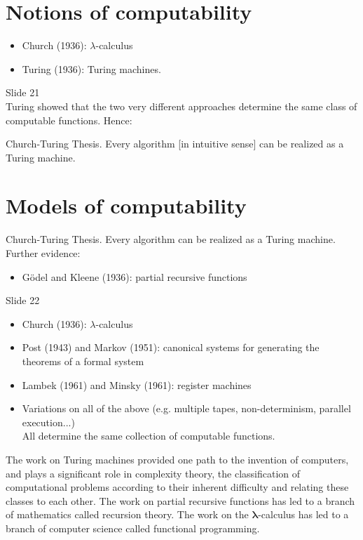 \documentclass[10pt]{article}
\begin{document}
\section*{Notions of computability}
\begin{itemize}
  \item Church (1936): $\lambda$-calculus
  \item Turing (1936): Turing machines.
\end{itemize}

Slide 21\\
Turing showed that the two very different approaches determine the same class of computable functions. Hence:

Church-Turing Thesis. Every algorithm [in intuitive sense] can be realized as a Turing machine.

\section*{Models of computability}
Church-Turing Thesis. Every algorithm can be realized as a Turing machine. Further evidence:

\begin{itemize}
  \item Gödel and Kleene (1936): partial recursive functions
\end{itemize}

Slide 22

\begin{itemize}
  \item Church (1936): $\lambda$-calculus
  \item Post (1943) and Markov (1951): canonical systems for generating the theorems of a formal system
  \item Lambek (1961) and Minsky (1961): register machines
  \item Variations on all of the above (e.g. multiple tapes, non-determinism, parallel execution...)\\
All determine the same collection of computable functions.
\end{itemize}

The work on Turing machines provided one path to the invention of computers, and plays a significant role in complexity theory, the classification of computational problems according to their inherent difficulty and relating these classes to each other. The work on partial recursive functions has led to a branch of mathematics called recursion theory. The work on the $\boldsymbol{\lambda}$-calculus has led to a branch of computer science called functional programming.
\end{document}
